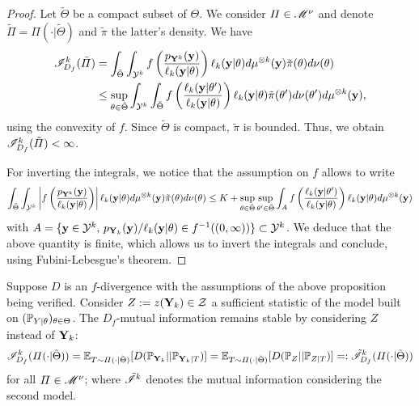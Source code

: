\begin{proof}
    Let $\tilde\Theta$ be a compact subset of $\Theta$. We consider $\varPi\in\mathscr{M}^\nu$ and denote $\tilde\varPi=\varPi(\cdot|\tilde\Theta)$ and  $\tilde\pi$ the latter's density. We have
        \begin{equation}
        \begin{aligned}
            \mathscr{I}^k_{D_f}(\tilde\varPi) &= \int_{\tilde\Theta}\int_{\mathcal{Y}^k} f\left( \frac{p_{\mathbf{Y}^k}(\mathbf{y})}{\ell_k(\mathbf{y}|\theta)}\right)\ell_k(\mathbf{y}|\theta) d\mu^{\otimes k}(\mathbf{y}) \tilde\pi(\theta)d\nu(\theta) \\
                &\leq \sup_{\theta\in\tilde\Theta}\int_{\mathcal{Y}^k} \int_{\tilde\Theta} f\left( \frac{\ell_k(\mathbf{y}|\theta')}{\ell_k(\mathbf{y}|\theta)}\right)\ell_k(\mathbf{y}|\theta) \tilde\pi(\theta')d\nu(\theta') d\mu^{\otimes k}(\mathbf{y}) ,
        \end{aligned}
        \end{equation}
        using the convexity of $f$. Since $\tilde\Theta$ is compact, $\tilde\pi$ is bounded. Thus, we obtain $\mathscr{I}^k_{D_f}(\tilde\varPi)<\infty$.

        For inverting the integrals, we notice that the assumption on $f$ allows to write 
        \begin{equation}
            \int_{\tilde\Theta}\int_{\mathcal{Y}^k} \left|f\left( \frac{p_{\mathbf{Y}^k}(\mathbf{y})}{\ell_k(\mathbf{y}|\theta)}\right)\right|\ell_k(\mathbf{y}|\theta) d\mu^{\otimes k}(\mathbf{y}) \tilde\pi(\theta)d\nu(\theta) \leq K + \sup_{\theta\in\tilde\Theta}\sup_{\theta'\in\tilde\Theta} \int_{A} f\left(\frac{\ell_k(\mathbf{y}|\theta')}{\ell_k(\mathbf{y}|\theta)}  \right) \ell_k(\mathbf{y}|\theta) d\mu^{\otimes k}(\mathbf{y})
        \end{equation}
        with $A=\{\mathbf{y}\in\mathcal{Y}^k,\, p_{\mathbf{Y}_k}(\mathbf{y})/\ell_k(\mathbf{y}|\theta)\in f^{-1}((0,\infty)) \}\subset\mathcal{Y}^k $. We deduce that the above quantity is finite, which allows us to invert the integrals and conclude, using Fubini-Lebesgue's theorem.
\end{proof}

\begin{prop}
    Suppose $D$ is an $f$-divergence with the assumptions of the above proposition being verified.
    Consider $Z:=z(\mathbf{Y}_k)\in\mathcal{Z}$ a sufficient statistic of the model built on $(\mathbb{P}_{Y|\theta})_{\theta\in\Theta}$. %
    The $D_f$-mutual information remains stable by considering $Z$ instead of $\mathbf{Y}_k$:
    \begin{equation}
        \mathscr{I}^k_{D_f}(\varPi(\cdot|\tilde\Theta)) = \mathbb{E}_{T\sim\varPi(\cdot|\tilde\Theta)}[D(\mathbb{P}_{\mathbf{Y}_k}||\mathbb{P}_{\mathbf{Y}_k|T} )] = \mathbb{E}_{T\sim\varPi(\cdot|\tilde\Theta)}[D(\mathbb{P}_{Z}||\mathbb{P}_{Z|T} )] =: \tilde{\mathscr{I}}_{D_f}^k(\varPi(\cdot|\tilde\Theta))
    \end{equation}
    for all $\varPi\in\mathscr{M}^\nu$; where $\tilde{\mathscr{I}}^k$ denotes the mutual information considering the second model.
\end{prop}

